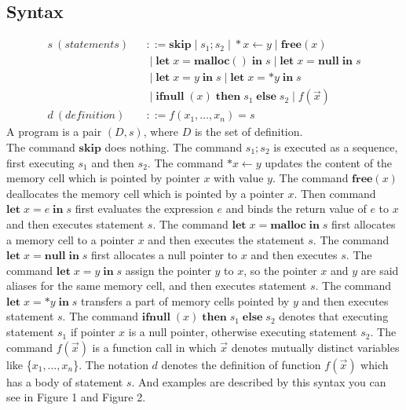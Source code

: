 \documentclass[english]{jssst_ppl} %
\newcommand\tB{\;|\;}
\newcommand\LET{\mathbf{let}\;}
\newcommand\IN{\mathbf{in}\;}
\newcommand\SKIP{\mathbf{skip}}
\newcommand\NULL{\mathbf{null}\;}
\newcommand\IFNULL{\mathbf{ifnull}\;}
\newcommand\THEN{\mathbf{then}\;}
\newcommand\ELSE{\mathbf{else}\;}
\newcommand\MALLOC{\mathbf{malloc()}\;}
\newcommand\Malloc{\mathbf{malloc}}
\newcommand\Free{\mathbf{free}}
\newcommand\Cirx{(x)}
\begin{document}
\subsection{Syntax}
\begin{eqnarray*}
  s \ (statements)& &::=  \SKIP \tB s_{1};s_{2} \tB *x \leftarrow y \tB \Free \Cirx \\
  & & \tB \LET x = \MALLOC \IN s \tB \LET x = \NULL \IN s  \\
  & & \tB \LET x = y \; \IN s \tB   \LET x = *y \; \IN s \\
  & &\tB \IFNULL(x) \; \THEN s_{1}\; \ELSE s_{2} \tB f(\vec{x})\\
  d \ (definition)& &::= f(x_{1},\dots,x_{n}) = s
\end{eqnarray*}
A program is a pair $(D,s)$, where $D$ is the set of definition.\\
The command $\SKIP$ does nothing. The command $s_{1};s_{2}$ is executed as a sequence, first executing $s_{1}$ and then $s_{2}$. The command $*x \leftarrow y$ updates the content of the memory cell which is pointed by pointer $x$ with value $y$. The command $\Free \Cirx$ deallocates the memory cell which is pointed by a pointer $x$. Then command $\LET x = e \; \IN s$ first evaluates the expression $e$ and binds the return value of $e$ to $x$ and then executes statement $s$. The command $\LET x = \Malloc \; \IN s$ first allocates a memory cell to a pointer $x$ and then executes the statement $s$. The command $\LET x = \NULL  \IN s$ first allocates a null pointer to $x$ and then executes $s$. The command $\LET x = y \; \IN s$ assign the pointer $y$ to $x$, so the pointer $x$ and $y$ are said aliases for the same memory cell, and then executes statement $s$. The command $\LET x = *y \; \IN s$ transfers a part of memory cells pointed by $y$ and then executes statement $s$. The command $\IFNULL(x) \; \THEN s_{1} \; \ELSE s_{2}$ denotes that  executing statement $s_{1}$ if pointer $x$ is a null pointer, otherwise executing statement $s_{2}$. The command $f(\vec{x})$ is a function call in which $\vec{x}$ denotes mutually distinct variables like \{$x_{1}, \dots, x_{n}$\}. The notation $d$ denotes the definition of function $f(\vec{x})$ which has a body of statement $s$. And examples are described by this syntax you can see in Figure 1 and  Figure 2.
\end{document}
